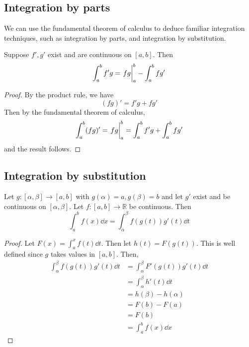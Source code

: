 \subsection{Integration by parts}
We can use the fundamental theorem of calculus to deduce familiar integration techniques, such as integration by parts, and integration by substitution.
\begin{corollary}
	Suppose \(f', g'\) exist and are continuous on \([a, b]\).
	Then
	\[
		\int_a^b f'g = \eval{fg}_a^b - \int_a^b fg'
	\]
\end{corollary}
\begin{proof}
	By the product rule, we have
	\[
		(fg)' = f'g + fg'
	\]
	Then by the fundamental theorem of calculus,
	\[
		\int_a^b (fg)' = \eval{fg}_a^b = \int_a^b f'g + \int_a^b fg'
	\]
	and the result follows.
\end{proof}

\subsection{Integration by substitution}
\begin{corollary}
	Let \(g \colon [\alpha, \beta] \to [a, b]\) with \(g(\alpha) = a, g(\beta) = b\) and let \(g'\) exist and be continuous on \([\alpha, \beta]\).
	Let \(f \colon [a, b] \to \mathbb R\) be continuous.
	Then
	\[
		\int_a^b f(x)\dd{x} = \int_\alpha^\beta f(g(t))g'(t)\dd{t}
	\]
\end{corollary}
\begin{proof}
	Let \(F(x) = \int_a^x f(t) \dd{t}\).
	Then let \(h(t) = F(g(t))\).
	This is well defined since \(g\) takes values in \([a, b]\).
	Then,
	\begin{align*}
		\int_\alpha^\beta f(g(t))g'(t)\dd{t} & = \int_\alpha^\beta F'(g(t))g'(t) \dd{t} \\
		                                     & = \int_\alpha^\beta h'(t) \dd{t}         \\
		                                     & = h(\beta) - h(\alpha)                   \\
		                                     & = F(b) - F(a)                            \\
		                                     & = F(b)                                   \\
		                                     & = \int_a^b f(x) \dd{x}
	\end{align*}
\end{proof}

